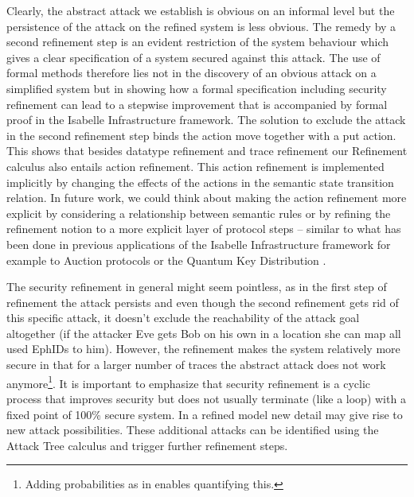 \documentclass{llncs}
\begin{document}
Clearly, the abstract attack we establish is obvious on an informal level but the persistence of the attack
on the refined system is less obvious. The remedy by a second refinement step is an evident restriction of
the system behaviour which gives a clear specification of a system secured against this attack. The use of
formal methods therefore lies not in the discovery of an obvious attack on a simplified system but in showing
how a formal specification including security refinement can lead to a stepwise improvement that is accompanied
by formal proof in the Isabelle Infrastructure framework. The solution to exclude the attack in the second refinement
step binds the action move together with a put action. %
This shows that besides datatype refinement and trace refinement our Refinement calculus also entails action
refinement. This action refinement is implemented implicitly by changing the effects of the actions
in the semantic state transition relation. In future work, we could think about making the action refinement
more explicit by considering a relationship between semantic rules or by refining the refinement notion to
a more explicit layer of protocol steps -- similar to what has been done in previous applications of the
Isabelle Infrastructure framework for example to Auction protocols \cite{kkp:17} or the Quantum Key Distribution \cite{kam:19c}.

The security refinement in general might seem pointless, as in the first step of refinement the attack
persists and even though the second refinement gets rid of this specific attack, it doesn't exclude the
reachability of the attack goal altogether (if the attacker Eve gets Bob on his own in a location she can
map all used EphIDs to him).
However, the refinement makes the system relatively more secure in that for a larger number of traces the abstract
attack does not work anymore\footnote{Adding probabilities as in \cite{kam:19c} enables quantifying this.}. 
It is important to emphasize that security refinement is a cyclic process that
improves security but does not usually terminate (like a loop) with a fixed point of 100\% secure system.
In a refined model new detail may give rise to new attack possibilities. These additional attacks can be
identified using the Attack Tree calculus and trigger further refinement steps.



\end{document}
